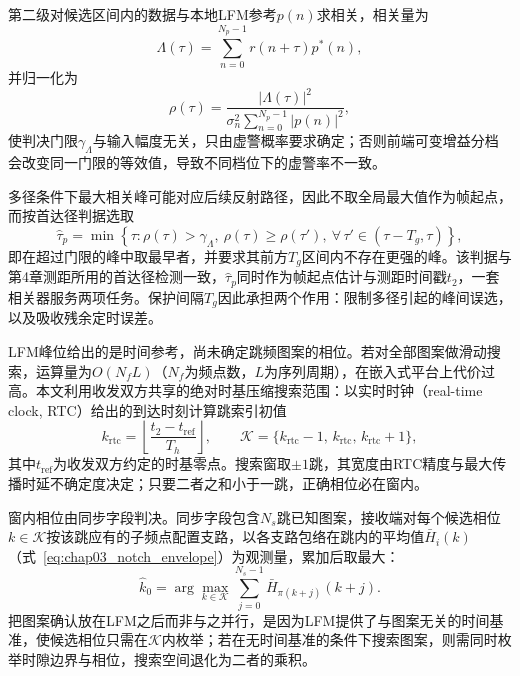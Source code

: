 第二级对候选区间内的数据与本地LFM参考$p(n)$求相关，相关量为
\begin{equation}
 \Lambda(\tau)=\sum_{n=0}^{N_p-1}r(n+\tau)p^*(n),
\label{eq:chap03_corr}
\end{equation}
并归一化为
\begin{equation}
 \rho(\tau)=\frac{|\Lambda(\tau)|^2}{\sigma_n^2\sum_{n=0}^{N_p-1}|p(n)|^2},
\label{eq:chap03_norm_corr}
\end{equation}
使判决门限$\gamma_\Lambda$与输入幅度无关，只由虚警概率要求确定；否则前端可变增益分档会改变同一门限的等效值，导致不同档位下的虚警率不一致。

多径条件下最大相关峰可能对应后续反射路径，因此不取全局最大值作为帧起点，而按首达径判据选取
\begin{equation}
 \hat\tau_p=\min\left\{\tau:\rho(\tau)>\gamma_\Lambda,\ \rho(\tau)\ge\rho(\tau'),\ \forall\,\tau'\in(\tau-T_g,\tau)\right\},
\label{eq:chap03_first_arrival}
\end{equation}
即在超过门限的峰中取最早者，并要求其前方$T_g$区间内不存在更强的峰。该判据与第4章测距所用的首达径检测一致，$\hat\tau_p$同时作为帧起点估计与测距时间戳$t_2$，一套相关器服务两项任务。保护间隔$T_g$因此承担两个作用：限制多径引起的峰间误选，以及吸收残余定时误差。

LFM峰位给出的是时间参考，尚未确定跳频图案的相位。若对全部图案做滑动搜索，运算量为$O(N_fL)$（$N_f$为频点数，$L$为序列周期），在嵌入式平台上代价过高。本文利用收发双方共享的绝对时基压缩搜索范围：以实时时钟（real-time clock, RTC）给出的到达时刻计算跳索引初值
\begin{equation}
 k_{\mathrm{rtc}}=\left\lfloor\frac{t_2-t_{\mathrm{ref}}}{T_h}\right\rfloor,\qquad
 \mathcal{K}=\{k_{\mathrm{rtc}}-1,\,k_{\mathrm{rtc}},\,k_{\mathrm{rtc}}+1\},
\label{eq:chap03_rtc_window}
\end{equation}
其中$t_{\mathrm{ref}}$为收发双方约定的时基零点。搜索窗取$\pm1$跳，其宽度由RTC精度与最大传播时延不确定度决定；只要二者之和小于一跳，正确相位必在窗内。

窗内相位由同步字段判决。同步字段包含$N_s$跳已知图案，接收端对每个候选相位$k\in\mathcal{K}$按该跳应有的子频点配置支路，以各支路包络在跳内的平均值$\bar H_i(k)$（式~\eqref{eq:chap03_notch_envelope}）为观测量，累加后取最大：
\begin{equation}
 \hat k_0=\arg\max_{k\in\mathcal{K}}\sum_{j=0}^{N_s-1}\bar H_{\pi(k+j)}(k+j).
\label{eq:chap03_pattern_decision}
\end{equation}
把图案确认放在LFM之后而非与之并行，是因为LFM提供了与图案无关的时间基准，使候选相位只需在$\mathcal{K}$内枚举；若在无时间基准的条件下搜索图案，则需同时枚举时隙边界与相位，搜索空间退化为二者的乘积。

